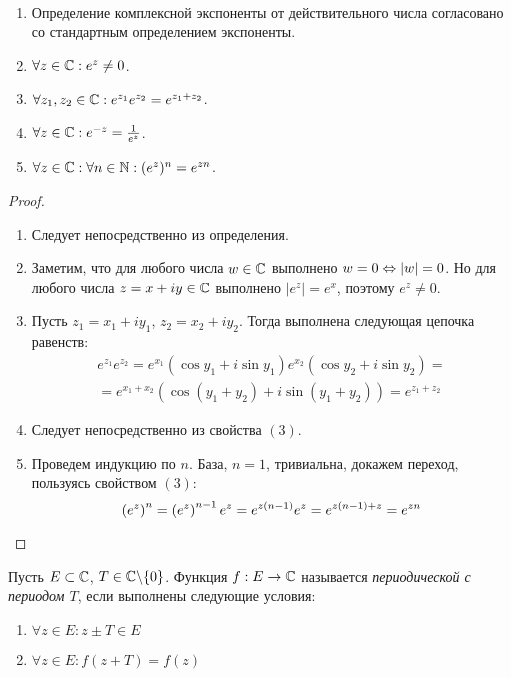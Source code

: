 \begin{proposition}~
	\begin{enumerate}
		\item Определение комплексной экспоненты от действительного числа согласовано со стандартным определением экспоненты.
		\item $\forall z \in \mathbb{C}: e^z \ne 0$.
		\item $\forall z_1, z_2 \in \mathbb{C}: e^{z_1}e^{z_2} = e^{z_1 + z_2}$.
		\item $\forall z \in \mathbb{C}: e^{-z} = \frac{1}{e^z}$.
		\item $\forall z \in \mathbb{C}: \forall n \in \mathbb{N}: (e^{z})^n = e^{zn}$.
	\end{enumerate}
\end{proposition}

\begin{proof}~
	\begin{enumerate}
		\item Следует непосредственно из определения.
		\item Заметим, что для любого числа $w \in \mathbb{C}$ выполнено $w = 0 \Leftrightarrow |w| = 0$. Но для любого числа $z = x + iy \in \mathbb{C}$ выполнено $|e^z| = e^x$, поэтому $e^z \ne 0$.
		\item Пусть $z_1 = x_1 + iy_1$, $z_2 = x_2 + iy_2$. Тогда выполнена следующая цепочка равенств:
		\begin{multline*}
			e^{z_1}e^{z_2} = e^{x_1}(\cos{y_1} + i\sin{y_1})e^{x_2}(\cos{y_2} + i\sin{y_2}) = \\
			= e^{x_1 + x_2}(\cos(y_1 + y_2) + i\sin(y_1 + y_2)) = e^{z_1 + z_2}
		\end{multline*}
		\item Следует непосредственно из свойства $(3)$.
		\item Проведем индукцию по $n$. База, $n = 1$, тривиальна, докажем переход, пользуясь свойством $(3)$:
		\[\left(e^z\right)^n = \left(e^z\right)^{n-1}e^z = e^{z(n-1)}e^z = e^{z(n-1) + z} = e^{zn}\qedhere\]
	\end{enumerate}
\end{proof}

\begin{definition}
	Пусть $E \subset \mathbb{C}$, $T \in \mathbb{C} \backslash \{0\}$. Функция $f : E \to \mathbb{C}$ называется \textit{периодической с периодом $T$}, если выполнены следующие условия:
	\begin{enumerate}
		\item $\forall z \in E: z \pm T \in E$
		\item $\forall z \in E: f(z + T) = f(z)$
	\end{enumerate}
\end{definition}

